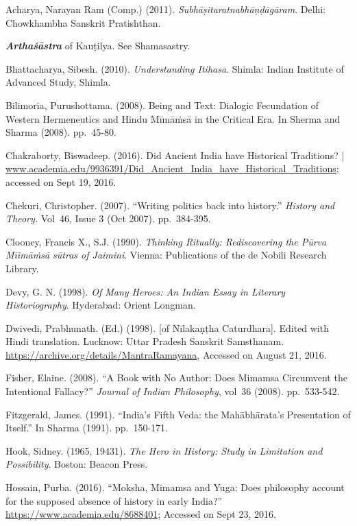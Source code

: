 \begin{thebibliography}{99}
 Acharya, Narayan Ram (Comp.) (2011). \textit{Subhāṣitaratnabhāṇḍāgāram}. Delhi: Chowkhambha Sanskrit Pratishthan.

  \textbf{\textit{Arthaśāstra}} of Kauṭilya. See Shamasastry.

  Bhattacharya, Sibesh. (2010). \textit{Understanding Itihasa}. Shimla: Indian Institute of Advanced Study, Shimla.

  Bilimoria, Purushottama. (2008). Being and Text: Dialogic Fecundation of Western Hermeneutics and Hindu Mīmāṁsā in the Critical Era. In Sherma and Sharma (2008). pp.~45-80.

  Chakraborty, Biswadeep. (2016). Did Ancient India have Historical Traditions? | \url{www.academia.edu/9936391/Did_Ancient_India_have_Historical_Traditions}; accessed on Sept 19, 2016.

  Chekuri, Christopher. (2007). “Writing politics back into history.” \textit{History and Theory.} Vol~46, Issue 3 (Oct 2007). pp.~384-395.

  Clooney, Francis X., S.J. (1990). \textit{Thinking Ritually: Rediscovering the Pūrva Mīimāṁsā sūtras of Jaimini}. Vienna: Publications of the de Nobili Research Library.

  Devy, G. N. (1998). \textit{Of Many Heroes: An Indian Essay in Literary Historiography}. Hyderabad: Orient Longman.

  Dwivedi, Prabhunath. (Ed.) (1998). [of Nīlakaṇṭha Caturdhara]. Edited with Hindi translation. Lucknow: Uttar Pradesh Sanskrit Samsthanam. \url{https://archive.org/details/MantraRamayana}, Accessed on August 21, 2016.

  Fisher, Elaine. (2008). “A Book with No Author: Does Mimamsa Circumvent the Intentional Fallacy?” \textit{Journal of Indian Philosophy}, vol~36 (2008). pp.~533-542.

  Fitzgerald, James. (1991). “India’s Fifth Veda: the Mahābhārata’s Presentation of Itself.” In Sharma (1991). pp.~150-171.

  Hook, Sidney. (1965, 19431). \textit{The Hero in History: Study in Limitation and Possibility}. Boston: Beacon Press.

  Hossain, Purba. (2016). “Moksha, Mimamsa and Yuga: Does philosophy account for the supposed absence of history in early India?” \url{https://www.academia.edu/8688401}; Accessed on Sept 23, 2016.


\end{thebibliography}
